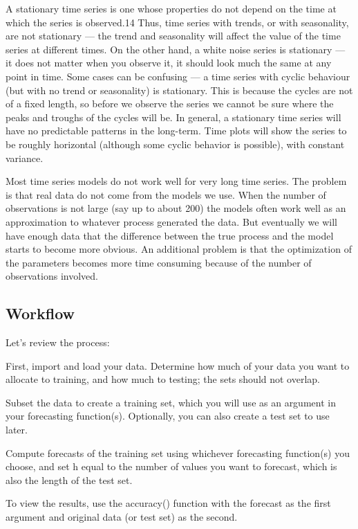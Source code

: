 \documentclass[]{book}
\begin{document}
A stationary time series is one whose properties do not depend on the
time at which the series is observed.14 Thus, time series with trends,
or with seasonality, are not stationary --- the trend and seasonality
will affect the value of the time series at different times. On the
other hand, a white noise series is stationary --- it does not matter
when you observe it, it should look much the same at any point in time.
Some cases can be confusing --- a time series with cyclic behaviour (but
with no trend or seasonality) is stationary. This is because the cycles
are not of a fixed length, so before we observe the series we cannot be
sure where the peaks and troughs of the cycles will be. In general, a
stationary time series will have no predictable patterns in the
long-term. Time plots will show the series to be roughly horizontal
(although some cyclic behavior is possible), with constant variance.

Most time series models do not work well for very long time series. The
problem is that real data do not come from the models we use. When the
number of observations is not large (say up to about 200) the models
often work well as an approximation to whatever process generated the
data. But eventually we will have enough data that the difference
between the true process and the model starts to become more obvious. An
additional problem is that the optimization of the parameters becomes
more time consuming because of the number of observations involved.

\subsection{Workflow}\label{workflow-1}

Let's review the process:

First, import and load your data. Determine how much of your data you
want to allocate to training, and how much to testing; the sets should
not overlap.

Subset the data to create a training set, which you will use as an
argument in your forecasting function(s). Optionally, you can also
create a test set to use later.

Compute forecasts of the training set using whichever forecasting
function(s) you choose, and set h equal to the number of values you want
to forecast, which is also the length of the test set.

To view the results, use the accuracy() function with the forecast as
the first argument and original data (or test set) as the second.
\end{document}
